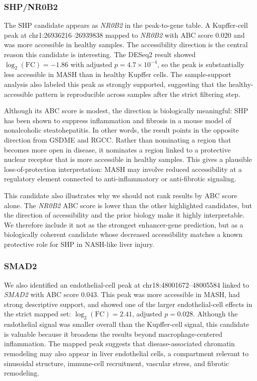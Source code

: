\documentclass[11pt]{article}
\begin{document}
  \subsubsection{SHP/NR0B2}
  The SHP candidate appears as \textit{NR0B2} in the peak-to-gene table.
  A Kupffer-cell peak at chr1:26936216--26939838 mapped to \textit{NR0B2} with ABC score 0.020 and was more accessible in healthy samples.
  The accessibility direction is the central reason this candidate is interesting.
  The DESeq2 result showed $\log_2(\mathrm{FC}) = -1.86$ with adjusted $p = 4.7 \times 10^{-4}$, so the peak is substantially less accessible in MASH than in healthy Kupffer cells.
  The sample-support analysis also labeled this peak as strongly supported, suggesting that the healthy-accessible pattern is reproducible across samples after the strict filtering step.

  Although its ABC score is modest, the direction is biologically meaningful: SHP has been shown to suppress inflammation and fibrosis in a mouse model of nonalcoholic steatohepatitis\cite{Zou2018SHP}.
  In other words, the result points in the opposite direction from GSDME and RGCC.
  Rather than nominating a region that becomes more open in disease, it nominates a region linked to a protective nuclear receptor that is more accessible in healthy samples.
  This gives a plausible loss-of-protection interpretation: MASH may involve reduced accessibility at a regulatory element connected to anti-inflammatory or anti-fibrotic signaling.

  This candidate also illustrates why we should not rank results by ABC score alone.
  The \textit{NR0B2} ABC score is lower than the other highlighted candidates, but the direction of accessibility and the prior biology make it highly interpretable.
  We therefore include it not as the strongest enhancer-gene prediction, but as a biologically coherent candidate whose decreased accessibility matches a known protective role for SHP in NASH-like liver injury.

  \subsubsection{SMAD2}
  We also identified an endothelial-cell peak at chr18:48001672--48005584 linked to \textit{SMAD2} with ABC score 0.043.
  This peak was more accessible in MASH, had strong descriptive support, and showed one of the larger endothelial-cell effects in the strict mapped set: $\log_2(\mathrm{FC}) = 2.41$, adjusted $p = 0.028$.
  Although the endothelial signal was smaller overall than the Kupffer-cell signal, this candidate is valuable because it broadens the results beyond macrophage-centered inflammation.
  The mapped peak suggests that disease-associated chromatin remodeling may also appear in liver endothelial cells, a compartment relevant to sinusoidal structure, immune-cell recruitment, vascular stress, and fibrotic remodeling.
\end{document}
